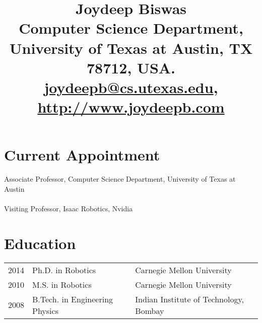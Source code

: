\documentclass[Times]{article}
\begin{document}
\title{
\vspace{-3em}
\textbf{Joydeep Biswas}\\
\vspace{0.5em}
\normalsize{
Computer Science Department, University of Texas at Austin, TX 78712, USA.\\
\href{mailto:joydeepb@cs.utexas.edu}{joydeepb@cs.utexas.edu}, \href{http://www.joydeepb.com}{http://www.joydeepb.com}\vspace{-3em}}
}
\date{}
\maketitle


\section*{Current Appointment}

Associate Professor, Computer Science Department,
University of Texas at Austin\\
\vspace{-0.5em}\\
Visiting Professor, Isaac Robotics, Nvidia

\section*{Education}
\begin{tabular}{ p{1.2cm} l l }
  2014  & Ph.D. in Robotics  & Carnegie Mellon University \\
  2010  & M.S. in Robotics  & Carnegie Mellon University \\
  2008  & B.Tech. in Engineering Physics & Indian Institute of Technology, Bombay \\
\end{tabular}
\end{document}
